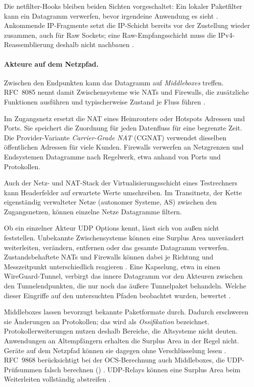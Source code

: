 Die netfilter-Hooks bleiben beiden Sichten vorgeschaltet: Ein lokaler Paketfilter kann ein Datagramm verwerfen, bevor
irgendeine Anwendung es sieht \cite{stephan2024packetpath}. Ankommende IP-Fragmente setzt die IP-Schicht bereits vor der
Zustellung wieder zusammen, auch für Raw Sockets; eine Raw-Empfangsschicht muss die IPv4-Reassemblierung deshalb nicht
nachbauen \cite{man7raw,stephan2024packetpath}.

\paragraph{Akteure auf dem Netzpfad.}
Zwischen den Endpunkten kann das Datagramm auf \textit{Middleboxes} treffen. RFC~8085 nennt damit Zwischensysteme wie
NATs und Firewalls, die zusätzliche Funktionen ausführen und typischerweise Zustand je Fluss führen
\cite[Sec.~3.5]{rfc8085}.

Im Zugangsnetz ersetzt die NAT eines Heimrouters oder Hotspots Adressen und Ports. Sie speichert die Zuordnung für jeden
Datenfluss für eine begrenzte Zeit. Die Provider-Variante \textit{Carrier-Grade NAT} (CGNAT) verwendet dieselben
öffentlichen Adressen für viele Kunden. Firewalls verwerfen an Netzgrenzen und Endsystemen Datagramme nach Regelwerk,
etwa anhand von Ports und Protokollen.

Auch der Netz- und NAT-Stack der Virtualisierungsschicht eines Testrechners kann Headerfelder auf erwartete Werte
umschreiben. Im Transitnetz, der Kette eigenständig verwalteter Netze (autonomer Systeme, AS) zwischen den
Zugangsnetzen, können einzelne Netze Datagramme filtern.

Ob ein einzelner Akteur UDP Options kennt, lässt sich von außen nicht feststellen. Unbekannte Zwischensysteme können
eine Surplus Area unverändert weiterleiten, verändern, entfernen oder das gesamte Datagramm verwerfen. Zustandsbehaftete
NATs und Firewalls können dabei je Richtung und Messzeitpunkt unterschiedlich reagieren \cite[Sec.~3.5]{rfc8085}. Eine
Kapselung, etwa in einen WireGuard-Tunnel, verbirgt das innere Datagramm vor den Akteuren zwischen den Tunnelendpunkten,
die nur noch das äußere Tunnelpaket behandeln. Welche dieser Eingriffe auf den untersuchten Pfaden beobachtet wurden,
bewertet .

Middleboxes lassen bevorzugt bekannte Paketformate durch. Dadurch erschweren sie Änderungen an Protokollen; das wird als
\textit{Ossifikation} bezeichnet. Protokollerweiterungen nutzen deshalb Bereiche, die Altsysteme nicht deuten.
Anwendungen an Altempfängern erhalten die Surplus Area in der Regel nicht. Geräte auf dem Netzpfad können sie dagegen
ohne Verschlüsselung lesen \cite[Sec.~16]{rfc9868}. RFC~9868 berücksichtigt bei der OCS-Berechnung auch Middleboxes, die
UDP-Prüfsummen falsch berechnen () \cite[Sec.~9]{rfc9868}. UDP-Relays können eine Surplus Area
beim Weiterleiten vollständig abstreifen \cite[Sec.~25.6]{rfc9868}.


